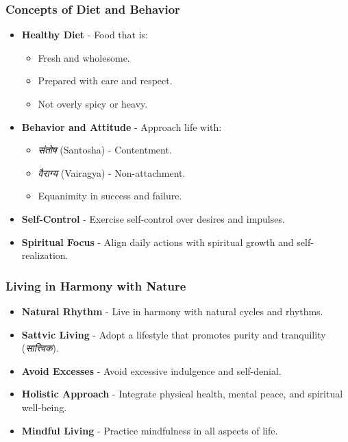 \begin{frame}[fragile]\frametitle{Concepts of Diet and Behavior}

      \begin{itemize}
		\item \textbf{Healthy Diet} - Food that is:
		  \begin{itemize}
		      \item Fresh and wholesome.
		      \item Prepared with care and respect.
		      \item Not overly spicy or heavy.
		  \end{itemize}
		\item \textbf{Behavior and Attitude} - Approach life with:
		  \begin{itemize}
		      \item \textit{संतोष} (Santosha) - Contentment.
		      \item \textit{वैराग्य} (Vairagya) - Non-attachment.
		      \item Equanimity in success and failure.
		  \end{itemize}
		\item \textbf{Self-Control} - Exercise self-control over desires and impulses.
		\item \textbf{Spiritual Focus} - Align daily actions with spiritual growth and self-realization.
	  \end{itemize}

\end{frame}

\begin{frame}[fragile]\frametitle{Living in Harmony with Nature}

      \begin{itemize}
		\item \textbf{Natural Rhythm} - Live in harmony with natural cycles and rhythms.
		\item \textbf{Sattvic Living} - Adopt a lifestyle that promotes purity and tranquility (\textit{सात्त्विक}).
		\item \textbf{Avoid Excesses} - Avoid excessive indulgence and self-denial.
		\item \textbf{Holistic Approach} - Integrate physical health, mental peace, and spiritual well-being.
		\item \textbf{Mindful Living} - Practice mindfulness in all aspects of life.
	  \end{itemize}

\end{frame}


